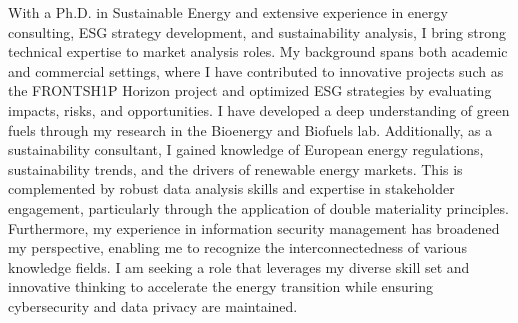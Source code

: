 
\begin{cvparagraph}

With a Ph.D. in Sustainable Energy and extensive experience in energy consulting, ESG strategy development, and sustainability analysis, I bring strong technical expertise to market analysis roles. My background spans both academic and commercial settings, where I have contributed to innovative projects such as the FRONTSH1P Horizon project and optimized ESG strategies by evaluating impacts, risks, and opportunities. I have developed a deep understanding of green fuels through my research in the Bioenergy and Biofuels lab. Additionally, as a sustainability consultant, I gained knowledge of European energy regulations, sustainability trends, and the drivers of renewable energy markets. This is complemented by robust data analysis skills and expertise in stakeholder engagement, particularly through the application of double materiality principles. Furthermore, my experience in information security management has broadened my perspective, enabling me to recognize the interconnectedness of various knowledge fields. I am seeking a role that leverages my diverse skill set and innovative thinking to accelerate the energy transition while ensuring cybersecurity and data privacy are maintained.

\end{cvparagraph}
